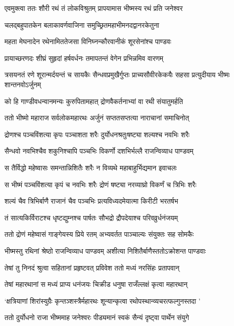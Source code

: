 \twolineshloka
{एवमुक्त्वा ततः शौरी रथं तं लोकविश्रुतम्}
{प्रापयामास भीष्मस्य रथं प्रति जनेश्वर}


\twolineshloka
{चलद्बहुपातकेन बलाकावर्णवाजिना}
{समुच्छ्रितमहाभीमनदद्वानरकेतुना}


\twolineshloka
{महता मेघनादेन रथेनामिततेजसा}
{विनिघ्नन्कौरवानीकं शूरसेनांश्च पाण्डवः}


\twolineshloka
{प्रायाच्छरणदः शीघ्रं सुहृदां हर्षवर्धनः}
{तमापतन्तं वेगेन प्रभिन्नमिव वारणम्}


\threelineshloka
{त्रसयनतं रणे शूरान्मर्दयन्तं च सायकैः}
{सैन्धवप्रमुखैर्गुप्तः प्राच्यसौवीरकेकयैः}
{सहसा प्रत्युदीयाय भीष्मः शान्तनवोऽर्जुनम्}


\twolineshloka
{को हि गाण्डीवधन्वानमन्यः कुरुपितामहात्}
{द्रोणवैकर्तनाभ्यां वा रथी संयातुमर्हति}


\twolineshloka
{ततो भीष्मो महाराज सर्वलोकमहारथः}
{अर्जुनं सप्ततसप्तत्या नाराचानां समाचिनोत्}


\twolineshloka
{द्रोणश्च पञ्चविंशत्या कृपः पञ्चाशता शरैः}
{दुर्योधनश्रतुःषष्ट्या शल्यश्च नवभिः शरैः}


\twolineshloka
{सैन्धवो नवभिश्चैव शकुनिश्चापि पञ्चभिः}
{विकर्णो दशभिर्भल्लै राजन्विव्याध पाण्डवम्}


\twolineshloka
{स तैर्विद्धो महेष्वासः समन्तान्निशितैः शरैः}
{न विव्यथे महाबाहुर्भिद्यमान इवाचलः}


\twolineshloka
{स भीष्मं पञ्चविंशत्या कृपं च नवभिः शरैः}
{द्रोणं षष्ट्या नरव्याघ्रो विकर्णं च त्रिभिः शरैः}


\twolineshloka
{शल्यं चैव त्रिभिर्बाणै राजानं चैव पञ्चभिः}
{प्रत्यविध्यदमेयात्मा किरीटी भरतर्षभ}


\twolineshloka
{तं सात्यकिर्विराटश्च धृष्टद्युम्नश्च पार्षतः}
{सौभद्रो द्रौपदेयाश्च परिवव्रुर्धनंजयम्}


\twolineshloka
{ततो द्रोणं महेष्वासं गाङ्गेयस्य प्रिये रतम्}
{अभ्यवर्तत पाञ्चाल्यः संयुक्तः सह सोमकैः}


\twolineshloka
{भीष्मस्तु रथिनां श्रेष्ठो राजन्विव्याध पाण्डवम्}
{अशीत्या निशितैर्बाणैस्ततोऽक्रोशन्त पाण्डवाः}


\twolineshloka
{तेषां तु निनदं श्रुत्वा सहितानां प्रहृष्टवत्}
{प्रविवेश ततो मध्यं नरसिंहः प्रतापवान्}


\twolineshloka
{तेषां महारथानां स मध्यं प्राप्य धनंजयः}
{चिक्रीड धनुषा राजँल्लक्षं कृत्वा महारथान्}


\threelineshloka
{`क्षत्रियाणां शिरांस्युग्रैः कृन्तञ्शस्त्रैर्महारथः}
{शून्यान्कृत्वा रथोपस्थान्व्यचरत्फल्गुनस्तदा}
{'}


\twolineshloka
{ततो दुर्योधनो राजा भीष्ममाह जनेश्वरः}
{पीड्यमानं स्वकं सैन्यं दृष्ट्वा पार्थेन संयुगे}



